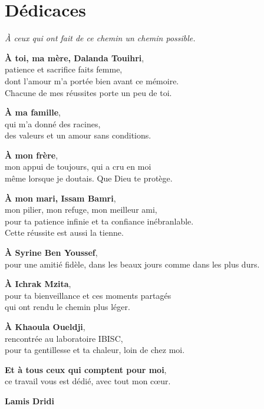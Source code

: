 \chapter*{Dédicaces}

\vspace*{-1cm}
\begin{flushright}
\begin{minipage}{0.82\textwidth}
\raggedleft
\itshape
\setlength{\parskip}{0.6em}

\textit{À ceux qui ont fait de ce chemin un chemin possible.}

\vspace{0.6em}

\textbf{À toi, ma mère, Dalanda Touihri},\\
patience et sacrifice faits femme,\\
dont l'amour m'a portée bien avant ce mémoire.\\
Chacune de mes réussites porte un peu de toi.

\textbf{À ma famille},\\
qui m'a donné des racines,\\
des valeurs et un amour sans conditions.

\textbf{À mon frère},\\
mon appui de toujours, qui a cru en moi\\
même lorsque je doutais. Que Dieu te protège.

\textbf{À mon mari, Issam Bamri},\\
mon pilier, mon refuge, mon meilleur ami,\\
pour ta patience infinie et ta confiance inébranlable.\\
Cette réussite est aussi la tienne.

\textbf{À Syrine Ben Youssef},\\
pour une amitié fidèle, dans les beaux jours comme dans les plus durs.

\textbf{À Ichrak Mzita},\\
pour ta bienveillance et ces moments partagés\\
qui ont rendu le chemin plus léger.

\textbf{À Khaoula Oueldji},\\
rencontrée au laboratoire IBISC,\\
pour ta gentillesse et ta chaleur, loin de chez moi.

\textbf{Et à tous ceux qui comptent pour moi},\\
ce travail vous est dédié, avec tout mon cœur.

\vspace{0.8em}
{\upshape\large\textbf{Lamis Dridi}}

\end{minipage}
\end{flushright}
